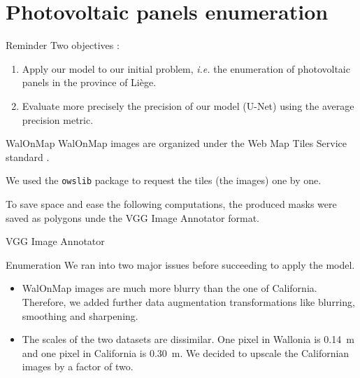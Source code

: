 \documentclass[12pt]{beamer}
\begin{document}
\section{Photovoltaic panels enumeration}

\begin{frame}{Reminder}
    Two objectives :
    
    \begin{enumerate}
        \item Apply our model to our \alert{initial problem}, \emph{i.e.} the enumeration of photovoltaic panels in the province of Liège.
        \item Evaluate more precisely the precision of our model (\alert{U-Net}) using the \alert{average precision} metric.
    \end{enumerate}
\end{frame}

\begin{frame}{WalOnMap}
    \alert{WalOnMap} \cite{walonmap} images are organized under the \alert{Web Map Tiles Service} standard \cite{maso2010opengis}.
    
    We used the \texttt{owslib} package to request the tiles (the images) \alert{one by one}.
    
    To save space and ease the following computations, the produced masks were saved as polygons unde the \alert{VGG Image Annotator} \cite{dutta2019via} format.
\end{frame}

\begin{frame}[standout]
    VGG Image Annotator
\end{frame}

\begin{frame}{Enumeration}
    We ran into two major issues before succeeding to apply the model.
    
    \begin{itemize}
        \item \alert{WalOnMap} images are much more \alert{blurry} than the one of \alert{California}. Therefore, we added further data augmentation transformations like blurring, smoothing and sharpening.
        \item The scales of the two datasets are dissimilar. One pixel in Wallonia is \alert{\SI{0.14}{\meter}} and one pixel in California is \alert{\SI{0.30}{\meter}}. We decided to upscale the Californian images by a factor of two.
    \end{itemize}
\end{frame}
\end{document}
